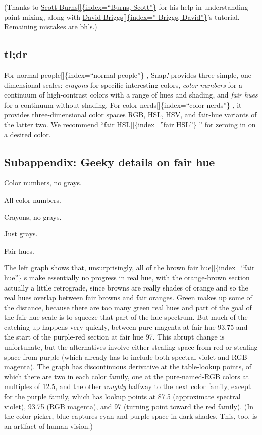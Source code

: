 \documentclass[
  letterpaper,
]{book}
\begin{document}
(Thanks to \href{http://scottburns.us/subtractive-color-mixture/}{Scott
Burns{[}{]}\{index=``Burns, Scott''\}} for his help in understanding
paint mixing, along with
\href{http://www.huevaluechroma.com/061.php}{David
Briggs{[}{]}\{index='' Briggs, David''\}}'s tutorial. Remaining mistakes
are bh's.)

\subsection{tl;dr}\label{tldr}

For normal people{[}{]}\{index=``normal people''\} , Snap\emph{!}
provides three simple, one-dimensional scales: \emph{crayons} for
specific interesting colors, \emph{color numbers} for a continuum of
high-contrast colors with a range of hues and shading, and \emph{fair
hues} for a continuum without shading. For color
nerds{[}{]}\{index=``color nerds''\} , it provides three-dimensional
color spaces RGB, HSL, HSV, and fair-hue variants of the latter two.
\label{spirals}{}We recommend ``fair
HSL{[}{]}\{index=''fair HSL''\} '' for zeroing in on a desired color.

\subsection{Subappendix: Geeky details on fair
hue}\label{subappendix-geeky-details-on-fair-hue}

Color numbers, no grays.

All color numbers.

Crayons, no grays.

Just grays.

Fair hues.

The left graph shows that, unsurprisingly, all of the brown fair
hue{[}{]}\{index=``fair hue''\} s make essentially no progress in real
hue, with the orange-brown section actually a little retrograde, since
browns are really shades of orange and so the real hues overlap between
fair browns and fair oranges. Green makes up some of the distance,
because there are too many green real hues and part of the goal of the
fair hue scale is to squeeze that part of the hue spectrum. But much of
the catching up happens very quickly, between pure magenta at fair hue
93.75 and the start of the purple-red section at fair hue 97. This
abrupt change is unfortunate, but the alternatives involve either
stealing space from red or stealing space from purple (which already has
to include both spectral violet and RGB magenta). The graph has
discontinuous derivative at the table-lookup points, of which there are
two in each color family, one at the pure-named-RGB colors at multiples
of 12.5, and the other \emph{roughly} halfway to the next color family,
except for the purple family, which has lookup points at 87.5
(approximate spectral violet), 93.75 (RGB magenta), and 97 (turning
point toward the red family). (In the color picker, blue captures cyan
and purple space in dark shades. This, too, is an artifact of human
vision.)
\end{document}
